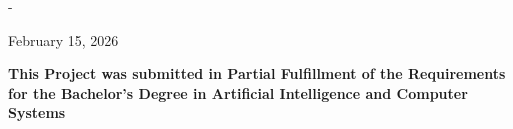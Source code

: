 \begin{titlingpage}
\begin{SingleSpace}
\begin{adjustwidth*}{\unitlength}{-\unitlength}
\begin{center}
\vspace{5mm}

\begin{center}
February 15, 2026
\end{center}

\vspace{5mm}

\begin{center}
\large \textbf{This Project was submitted in Partial Fulfillment of
the Requirements for the Bachelor’s Degree in Artificial Intelligence and Computer Systems}
\end{center}

\end{center}

\end{adjustwidth*}
\end{SingleSpace}
\end{titlingpage}